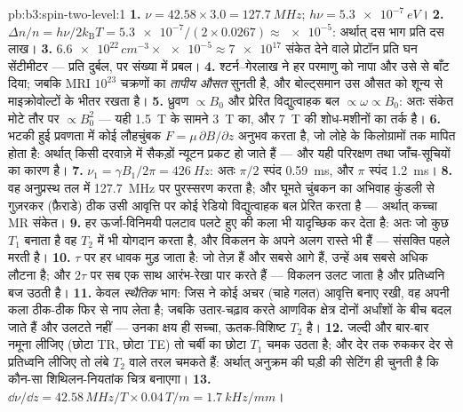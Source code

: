 \begin{solution}{pb:b3:spin-two-level:1}
\textbf{1.} $\nu = 42.58 \times 3.0 = \qty{127.7}{MHz}$; $h\nu =
\qty{5.3e-7}{eV}$।
\textbf{2.} $\Delta n/n = h\nu/2k_{\text{B}}T = \num{5.3e-7}/(2
\times 0.0267) \approx \num{e-5}$: अर्थात् दस भाग प्रति दस लाख।
\textbf{3.} $\num{6.6e22}\,\unit{cm^{-3}} \times \num{e-5} \approx
\num{7e17}$ संकेत देने वाले प्रोटॉन प्रति घन सेंटीमीटर --- प्रति
 दुर्बल, पर संख्या में प्रबल।
\textbf{4.} श्टर्न--गेरलाख ने हर परमाणु को नापा और उसे
 से बाँट दिया; जबकि MRI $10^{23}$ चक्रणों का
\emph{तापीय औसत} सुनती है, और बोल्ट्समान उस औसत को शून्य से
माइक्रोवोल्टों के भीतर रखता है।
\textbf{5.} ध्रुवण $\propto B_0$ और प्रेरित विद्युत्वाहक बल
$\propto \omega \propto B_0$: अतः संकेत मोटे तौर पर $\propto B_0^2$ ---
यही \qty{1.5}{T} के सामने \qty{3}{T} का, और
\qty{7}{T} की शोध-मशीनों का तर्क है।
\textbf{6.} भटकी हुई प्रवणता में कोई लौहचुंबक
$F = \mu\,\partial B/\partial z$ अनुभव करता है, जो लोहे के किलोग्रामों
तक मापित होता है: अर्थात् किसी दरवाज़े में सैकड़ों न्यूटन प्रकट हो
जाते हैं --- और यही परिरक्षण तथा जाँच-सूचियों का कारण है।
\textbf{7.} $\nu_1 = \gamma B_1/2\pi = \qty{426}{Hz}$: अतः $\pi/2$
स्पंद \qty{0.59}{ms}, और $\pi$ स्पंद \qty{1.2}{ms}।
\textbf{8.} वह अनुप्रस्थ तल में \qty{127.7}{MHz} पर पुरस्सरण करता
है; और घूमते चुंबकन का अभिवाह कुंडली से गुज़रकर (फ़ैराडे) ठीक उसी
आवृत्ति पर कोई रेडियो विद्युत्वाहक बल प्रेरित करता है ---
अर्थात् कच्चा MR संकेत।
\textbf{9.} हर ऊर्जा-विनिमयी पलटाव पलटे हुए  की कला भी
यादृच्छिक कर देता है: अतः जो कुछ $T_1$ बनाता है वह $T_2$ में भी
योगदान करता है, और विकलन के अपने अलग रास्ते भी हैं --- संसक्ति पहले
मरती है।
\textbf{10.} $\tau$ पर हर धावक मुड़ जाता है: जो तेज़ हैं और सबसे आगे
हैं, उन्हें अब सबसे अधिक लौटना है; और $2\tau$ पर सब एक साथ
आरंभ-रेखा पार करते हैं --- विकलन उलट जाता है और
प्रतिध्वनि बज उठती है।
\textbf{11.} केवल \emph{स्थैतिक} भाग: जिस  ने कोई
अचर (चाहे गलत) आवृत्ति बनाए रखी, वह अपनी कला ठीक-ठीक फिर से नाप लेता
है; जबकि उतार-चढ़ाव करते आणविक क्षेत्र दोनों अर्धांशों के बीच बदल जाते
हैं और उलटते नहीं --- उनका क्षय ही सच्चा, ऊतक-विशिष्ट $T_2$ है।
\textbf{12.} जल्दी और बार-बार नमूना लीजिए (छोटा TR, छोटा TE) तो
चर्बी का छोटा $T_1$ चमक उठता है; और देर तक रुककर देर से प्रतिध्वनि
लीजिए तो लंबे $T_2$ वाले तरल चमकते हैं: अर्थात् अनुक्रम की घड़ी की
सेटिंग ही चुनती है कि कौन-सा शिथिलन-नियतांक चित्र बनाएगा।
\textbf{13.} $\dd\nu/\dd z = 42.58\,\unit{MHz/T} \times
0.04\,\unit{T/m} = \qty{1.7}{kHz/mm}$।

\end{solution}
